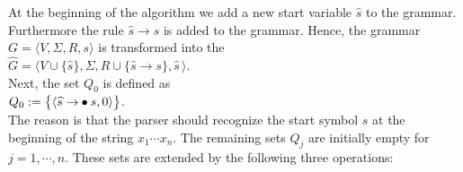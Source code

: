 At the beginning of the algorithm we add a new start variable  $\widehat{s}$ to the grammar.  Furthermore the
rule $\widehat{s} \rightarrow s$ is added to the grammar.  Hence, the grammar $G = \langle V, \Sigma, R, s \rangle$
is transformed into the 
\\[0.2cm]
\hspace*{1.3cm}
$\widehat{G} = \langle V \cup \{\widehat{s}\}, \Sigma, R \cup \{ \widehat{s} \rightarrow s \}, \widehat{s} \,\rangle$. 
\\[0.2cm]
Next, the set $Q_0$ is defined as
\\[0.2cm]
\hspace*{1.3cm}
$Q_0 := \bigl\{ \pair(\widehat{s} \rightarrow \mdot s, 0) \bigr\}$.
\\[0.2cm]
The reason is that the  parser should recognize the start symbol $s$ at the beginning of the string $x_1 \cdots
x_n$.
The remaining sets  $Q_j$ are initially empty for $j=1,\cdots,n$.  These sets are extended by the
following three operations: 
